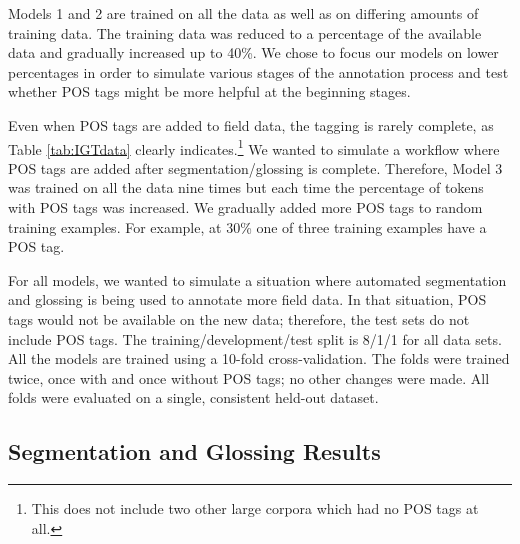 Models 1 and 2 are trained on all the data as well as on differing amounts of training data. The training data was reduced to a percentage of the available data and gradually increased up to 40\%. We chose to focus our models on lower percentages in order to simulate various stages of the annotation process and test whether POS tags might be more helpful at the beginning stages. 

Even when POS tags are added to field data, the tagging is rarely complete, as  Table \ref{tab:IGTdata} clearly indicates.\footnote{This does not include two other large corpora which had no POS tags at all.}  
We wanted to simulate a workflow where POS tags are added after segmentation/glossing is complete. Therefore, Model 3 was trained on all the data nine times but each time the percentage of tokens with POS tags was increased. We gradually added more POS tags to random training examples. For example, at 30\% one of three training examples have a POS tag. 

For all models, we wanted to simulate a situation where automated segmentation and glossing is being used to annotate more field data. In that situation, POS tags would not be available on the new data; therefore, the test sets do not include POS tags. The training/development/test split is 8/1/1 for all data sets. All the models are trained using a 10-fold cross-validation. The folds were trained twice, once with and once without POS tags; no other changes were made. All folds were evaluated on a single, consistent held-out dataset.

\subsection{Segmentation and Glossing Results}
\label{sec:segglsresults}

